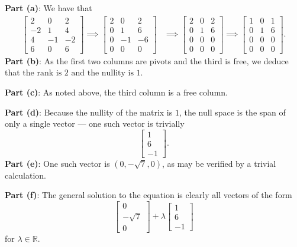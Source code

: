 \documentclass[11pt]{article}
\begin{document}
\textbf{Part (a)}: We have that
\begin{align*}
	\begin{bmatrix} 2 & 0 & 2 \\ -2 & 1 & 4 \\ 4 & -1 & -2 \\ 6 & 0 & 6 \end{bmatrix} \implies \begin{bmatrix}  2 & 0 & 2 \\ 0 & 1 & 6 \\ 0 & -1 & -6 \\ 0 & 0 & 0 \end{bmatrix} &\implies \begin{bmatrix} 2 & 0 & 2 \\ 0 & 1 & 6 \\ 0 & 0 & 0 \\ 0 & 0 & 0 \end{bmatrix} \implies \begin{bmatrix} 1 & 0 & 1 \\ 0 & 1 & 6 \\ 0 & 0 & 0 \\ 0 & 0 & 0 \end{bmatrix}.
\end{align*}
\textbf{Part (b)}: As the first two columns are pivots and the third is free, we deduce that $\boxed{\text{the rank is $2$ and the nullity is $1$}}$.

\textbf{Part (c)}: As noted above, the third column is a $\boxed{\text{free column}}$.

\textbf{Part (d)}: Because the nullity of the matrix is $1$, the null space is the span of only a single vector --- one such vector is trivially
\[
	\begin{bmatrix} 1 \\ 6 \\ -1 \end{bmatrix}.
\]
\textbf{Part (e)}: One such vector is $\boxed{(0, -\sqrt{7}, 0)}$, as may be verified by a trivial calculation.

\textbf{Part (f)}: The general solution to the equation is clearly all vectors of the form
\[
	\begin{bmatrix} 0 \\ -\sqrt{7} \\ 0 \end{bmatrix} + \lambda \begin{bmatrix} 1 \\ 6 \\ -1 \end{bmatrix} 
\]
for $\lambda \in \mathbb{R}$.

\end{document}
